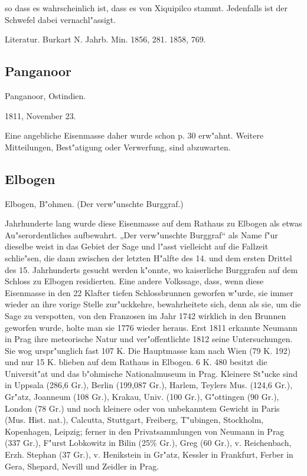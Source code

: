 \documentclass[a4paper, 11pt, oneside]{article}
\begin{document}
so dass es wahrscheinlich ist, dass es von Xiquipilco stammt. Jedenfalls ist der Schwefel dabei vernachl"assigt.

Literatur. Burkart N. Jahrb. Min. 1856, 281. 1858, 769.

\subsection{Panganoor}

Panganoor, Ostindien.

1811, November 23.

Eine angebliche Eisenmasse daher wurde schon p. 30 erw"ahnt.
Weitere Mitteilungen, Best"atigung oder Verwerfung, sind abzuwarten.

\subsection{Elbogen}

Elbogen, B"ohmen. (Der verw"unschte Burggraf.)

Jahrhunderte lang wurde diese Eisenmasse auf dem Rathaus zu Elbogen als etwas Au"serordentliches aufbewahrt. „Der verw"unschte Burggraf“ als Name f"ur dieselbe weist in das Gebiet der Sage und l"asst vielleicht auf die Fallzeit schlie"sen, die dann zwischen der letzten H"alfte des 14. und dem ersten Drittel des 15. Jahrhunderts gesucht werden k"onnte, wo kaiserliche Burggrafen auf dem Schloss zu Elbogen residierten. Eine andere Volkssage, dass, wenn diese Eisenmasse in den 22 Klafter tiefen Schlossbrunnen geworfen w"urde, sie immer wieder an ihre vorige Stelle zur"uckkehre, bewahrheitete sich, denn als sie, um die Sage zu verspotten, von den Franzosen im Jahr 1742 wirklich in den Brunnen geworfen wurde, holte man sie 1776 wieder heraus. Erst 1811 erkannte Neumann in Prag ihre meteorische Natur und ver"offentlichte 1812 seine Untersuchungen. Sie wog urspr"unglich fast 107 K. Die Hauptmasse kam nach Wien (79 K. 192) und nur 15 K. blieben auf dem Rathaus in Elbogen. 6 K. 480 besitzt die Universit"at und das b"ohmische Nationalmuseum in Prag. Kleinere St"ucke sind in Uppsala (286,6 Gr.), Berlin (199,087 Gr.), Harlem, Teylers Mus. (124,6 Gr.), Gr"atz, Joanneum (108 Gr.), Krakau, Univ. (100 Gr.), G"ottingen (90 Gr.), London (78 Gr.) und noch kleinere oder von unbekanntem Gewicht in Paris (Mus. Hist. nat.), Calcutta, Stuttgart, Freiberg, T"ubingen, Stockholm, Kopenhagen, Leipzig; ferner in den Privatsammlungen von Neumann in Prag (337 Gr.), F"urst Lobkowitz in Bilin (25\% Gr.), Greg (60 Gr.), v. Reichenbach, Erzh. Stephan (37 Gr.), v. Henikstein in Gr"atz, Kessler in Frankfurt, Ferber in Gera, Shepard, Nevill und Zeidler in Prag.
\end{document}
